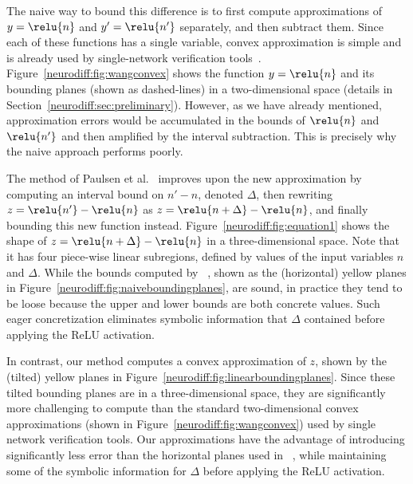 The naive way to bound this difference is to first compute
approximations of $ y = \relu{n} $ and $ y' = \relu{n'} $ separately,
and then subtract them.  Since each of these functions has a single
variable, convex approximation is simple and is already used by
single-network verification tools~\cite{SinghGPV19,WangPWYJ18nips,WengZCSHDBD18}.
Figure~\ref{neurodiff:fig:wangconvex} shows the function $y=\relu{n}$ and its
bounding planes (shown as dashed-lines) in a two-dimensional space (details in
Section~\ref{neurodiff:sec:preliminary}).
%
However, as we have already mentioned, approximation errors would be
accumulated in the bounds of $\relu{n}$ and $\relu{n'}$ and then amplified
by the interval subtraction.  This is precisely why the naive approach
performs poorly.


The \ReluDiff{} method of Paulsen et al.~\cite{PaulsenWW20} improves
upon the new approximation by computing an interval bound on $ n' - n
$, denoted $ \Delta $, then rewriting $z = \relu{n'} - \relu{n} $ as $
z= \relu{n + \Delta} - \relu{n} $, and finally bounding this new
function instead.
%
Figure~\ref{neurodiff:fig:equation1} shows the shape of $ z = \relu{n
+ \Delta}- \relu{n} $ in a three-dimensional space. Note that it has
four piece-wise linear subregions, defined by values of the input
variables $n$ and $\Delta$.
%
While the bounds computed by \ReluDiff{}~\cite{PaulsenWW20}, shown as
the (horizontal) yellow planes in
Figure~\ref{neurodiff:fig:naiveboundingplanes}, are sound, in practice they tend
to be loose because the upper and lower bounds are both concrete
values.  Such eager concretization eliminates symbolic information
that $ \Delta $ contained before applying the ReLU activation.


In contrast, our method computes a convex approximation of $ z $,
shown by the (tilted) yellow planes in
Figure~\ref{neurodiff:fig:linearboundingplanes}.
%
Since these tilted bounding planes are in a three-dimensional space,
they are significantly more challenging to compute than the standard
two-dimensional convex approximations (shown in
Figure~\ref{neurodiff:fig:wangconvex})
used by single network verification tools.
%
Our approximations have the advantage of introducing significantly less
error than the horizontal planes used
in \ReluDiff{}~\cite{PaulsenWW20}, while maintaining some of the
symbolic information for $ \Delta $ before applying the ReLU
activation.


